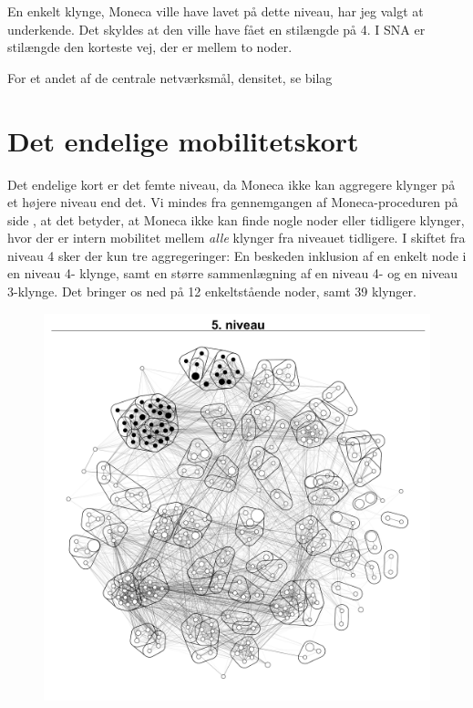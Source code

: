 En enkelt klynge, Moneca ville have lavet på dette niveau, har jeg valgt at underkende. Det skyldes at den ville have fået en stilængde på 4. I SNA er stilængde den korteste vej, der er mellem to noder. 

For et andet af de centrale netværksmål, densitet, se bilag 



\section{Det endelige mobilitetskort \label{delanalyse1_endelige mobilitetskort}}

Det endelige kort er det femte niveau, da Moneca ikke kan aggregere klynger på et højere niveau end det. Vi mindes fra gennemgangen af Moneca-proceduren på side  \pageref{metode_monecastepbystep}, at det betyder, at Moneca ikke kan finde nogle noder eller tidligere klynger, hvor der er intern mobilitet mellem  \emph{alle} klynger fra niveauet tidligere. %
I skiftet fra niveau 4 sker der kun tre aggregeringer: En beskeden inklusion af en enkelt node i en niveau 4- klynge, samt en større sammenlægning af en niveau 4- og en niveau 3-klynge. Det bringer os ned på 12 enkeltstående noder, samt 39 klynger. 

\begin{figure}[H]
\begin{centering}
  \includegraphics[width=10 cm]{fig/netvaerkskort/kort_seg_proces5.pdf}
  \label{fig_delanalyse1_kort_seg_proces5}
  \caption{}
\end{centering}
\end{figure}

